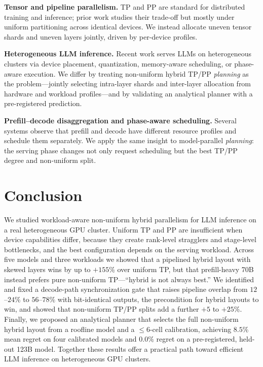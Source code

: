 \documentclass[twocolumn]{article}
\begin{document}
\textbf{Tensor and pipeline parallelism.} TP and PP are standard for distributed training and inference; prior work studies their trade-off but mostly under uniform partitioning across identical devices. We instead allocate uneven tensor shards and uneven layers jointly, driven by per-device profiles.

\textbf{Heterogeneous LLM inference.} Recent work serves LLMs on heterogeneous clusters via device placement, quantization, memory-aware scheduling, or phase-aware execution. We differ by treating non-uniform hybrid TP/PP \emph{planning} as the problem---jointly selecting intra-layer shards and inter-layer allocation from hardware and workload profiles---and by validating an analytical planner with a pre-registered prediction.

\textbf{Prefill--decode disaggregation and phase-aware scheduling.} Several systems observe that prefill and decode have different resource profiles and schedule them separately. We apply the same insight to model-parallel \emph{planning}: the serving phase changes not only request scheduling but the best TP/PP degree and non-uniform split.

\section{Conclusion}

We studied workload-aware non-uniform hybrid parallelism for LLM inference on a real heterogeneous GPU cluster. Uniform TP and PP are insufficient when device capabilities differ, because they create rank-level stragglers and stage-level bottlenecks, and the best configuration depends on the serving workload. Across five models and three workloads we showed that a pipelined hybrid layout with skewed layers wins by up to $+155\%$ over uniform TP, but that prefill-heavy 70B instead prefers pure non-uniform TP---``hybrid is not always best.'' We identified and fixed a decode-path synchronization gate that raises pipeline overlap from $12$--$24\%$ to $56$--$78\%$ with bit-identical outputs, the precondition for hybrid layouts to win, and showed that non-uniform TP/PP splits add a further $+5$ to $+25\%$. Finally, we proposed an analytical planner that selects the full non-uniform hybrid layout from a roofline model and a $\le 6$-cell calibration, achieving $8.5\%$ mean regret on four calibrated models and $0.0\%$ regret on a pre-registered, held-out 123B model. Together these results offer a practical path toward efficient LLM inference on heterogeneous GPU clusters.
\end{document}
